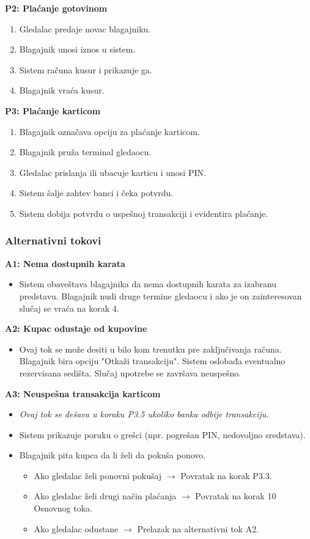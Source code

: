 \textbf{P2: Plaćanje gotovinom}
\begin{enumerate}
    \item Gledalac predaje novac blagajniku.
    \item Blagajnik unosi iznos u sistem.
    \item Sistem računa kusur i prikazuje ga.
    \item Blagajnik vraća kusur.
\end{enumerate}

\textbf{P3: Plaćanje karticom}
\begin{enumerate}
    \item Blagajnik označava opciju za plaćanje karticom.
    \item Blagajnik pruža terminal gledaocu.
    \item Gledalac prislanja ili ubacuje karticu i unosi PIN.
    \item Sistem šalje zahtev banci i čeka potvrdu.
    \item Sistem dobija potvrdu o uspešnoj transakciji i evidentira plaćanje.
    
\end{enumerate}

\subsubsection*{Alternativni tokovi}

\textbf{A1: Nema dostupnih karata}
\begin{itemize}
    \item Sistem obaveštava blagajnika da nema dostupnih karata za izabranu predstavu. Blagajnik nudi druge termine gledaocu i ako je on zainteresovan slučaj se vraća na korak 4.
\end{itemize}

\textbf{A2: Kupac odustaje od kupovine}
\begin{itemize}
    \item Ovaj tok se može desiti u bilo kom trenutku pre zaključivanja računa. Blagajnik bira opciju "Otkaži transakciju". Sistem oslobađa eventualno rezervisana sedišta. Slučaj upotrebe se završava neuspešno.
\end{itemize}

\textbf{A3: Neuspešna transakcija karticom}
\begin{itemize}
    \item \textit{Ovaj tok se dešava u koraku P3.5 ukoliko banka odbije transakciju.}
    \item Sistem prikazuje poruku o grešci (npr. pogrešan PIN, nedovoljno sredstava).
    \item Blagajnik pita kupca da li želi da pokuša ponovo.
    \begin{itemize}
        \item Ako gledalac želi ponovni pokušaj $\rightarrow$ Povratak na korak P3.3.
        \item Ako gledalac želi drugi način plaćanja $\rightarrow$ Povratak na korak 10 Osnovnog toka.
        \item Ako gledalac odustane $\rightarrow$ Prelazak na alternativni tok A2.
    \end{itemize}
\end{itemize}

